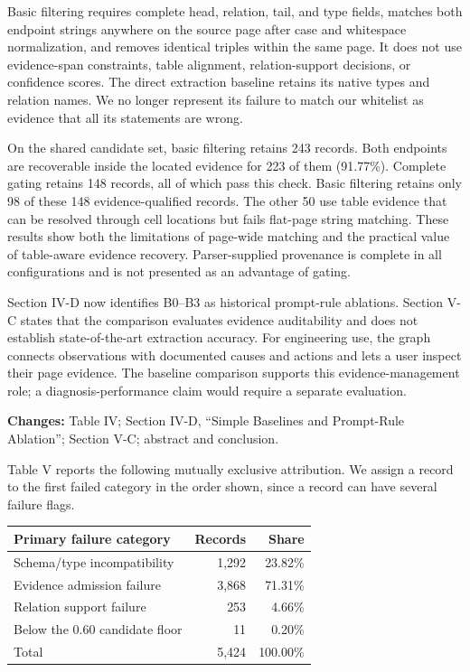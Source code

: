 Basic filtering requires complete head, relation, tail, and type fields, matches both endpoint strings anywhere on the source page after case and whitespace normalization, and removes identical triples within the same page. It does not use evidence-span constraints, table alignment, relation-support decisions, or confidence scores. The direct extraction baseline retains its native types and relation names. We no longer represent its failure to match our whitelist as evidence that all its statements are wrong.

On the shared candidate set, basic filtering retains 243 records. Both endpoints are recoverable inside the located evidence for 223 of them (91.77\%). Complete gating retains 148 records, all of which pass this check. Basic filtering retains only 98 of these 148 evidence-qualified records. The other 50 use table evidence that can be resolved through cell locations but fails flat-page string matching. These results show both the limitations of page-wide matching and the practical value of table-aware evidence recovery. Parser-supplied provenance is complete in all configurations and is not presented as an advantage of gating.

Section IV-D now identifies B0--B3 as historical prompt-rule ablations. Section V-C states that the comparison evaluates evidence auditability and does not establish state-of-the-art extraction accuracy. For engineering use, the graph connects observations with documented causes and actions and lets a user inspect their page evidence. The baseline comparison supports this evidence-management role; a diagnosis-performance claim would require a separate evaluation.

\textbf{Changes:} Table IV; Section IV-D, ``Simple Baselines and Prompt-Rule Ablation''; Section V-C; abstract and conclusion.


Table V reports the following mutually exclusive attribution. We assign a record to the first failed category in the order shown, since a record can have several failure flags.

\begin{center}
\begin{tabular}{lrr}
\toprule
Primary failure category & Records & Share \\
\midrule
Schema/type incompatibility & 1,292 & 23.82\% \\
Evidence admission failure & 3,868 & 71.31\% \\
Relation support failure & 253 & 4.66\% \\
Below the 0.60 candidate floor & 11 & 0.20\% \\
\midrule
Total & 5,424 & 100.00\% \\
\bottomrule
\end{tabular}
\end{center}

